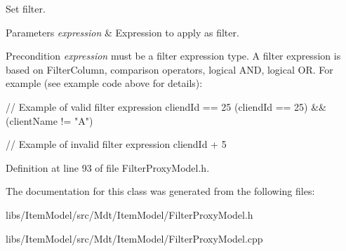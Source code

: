 Set filter. 


\begin{DoxyParams}{Parameters}
{\em expression} & Expression to apply as filter. \\
\hline
\end{DoxyParams}
\begin{DoxyPrecond}{Precondition}
{\itshape expression} must be a filter expression type. A filter expression is based on Filter\+Column, comparison operators, logical A\+ND, logical OR. For example (see example code above for details)\+: 
\begin{DoxyCode}
\textcolor{comment}{// Example of valid filter expression}
cliendId == 25
(cliendId == 25) && (clientName != \textcolor{stringliteral}{"A"})

\textcolor{comment}{// Example of invalid filter expression}
cliendId + 5
\end{DoxyCode}
 
\end{DoxyPrecond}


Definition at line 93 of file Filter\+Proxy\+Model.\+h.



The documentation for this class was generated from the following files\+:\begin{DoxyCompactItemize}
\item 
libs/\+Item\+Model/src/\+Mdt/\+Item\+Model/Filter\+Proxy\+Model.\+h\item 
libs/\+Item\+Model/src/\+Mdt/\+Item\+Model/Filter\+Proxy\+Model.\+cpp\end{DoxyCompactItemize}
